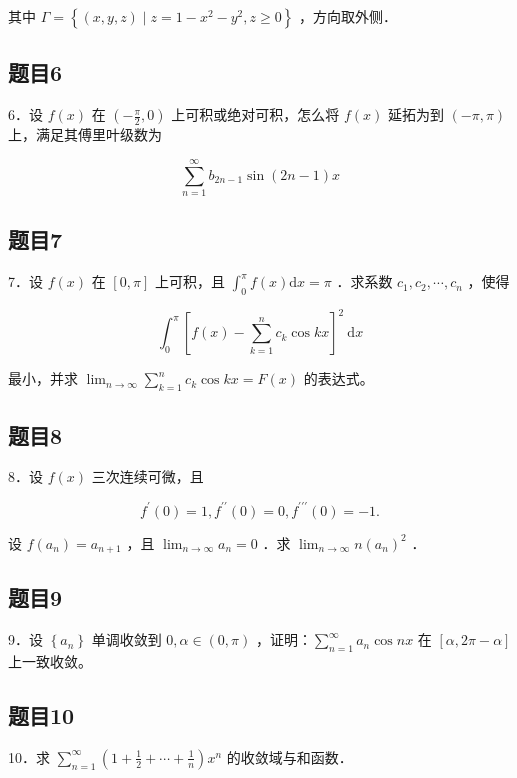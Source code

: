 \documentclass{article}
\begin{document}
其中 \(\Gamma=\left\{(x, y, z) \mid z=1-x^{2}-y^{2}, z \geq 0\right\}\) ，方向取外侧．

\subsection{题目6}
6．设 \(f(x)\) 在 \(\left(-\frac{\pi}{2}, 0\right)\) 上可积或绝对可积，怎么将 \(f(x)\) 延拓为到 \((-\pi, \pi)\) 上，满足其傅里叶级数为

\[
\sum_{n=1}^{\infty} b_{2 n-1} \sin (2 n-1) x
\]

\subsection{题目7}
7．设 \(f(x)\) 在 \([0, \pi]\) 上可积，且 \(\int_{0}^{\pi} f(x) \mathrm{d} x=\pi\) ．求系数 \(c_{1}, c_{2}, \cdots, c_{n}\) ，使得

\[
\int_{0}^{\pi}\left[f(x)-\sum_{k=1}^{n} c_{k} \cos k x\right]^{2} \mathrm{~d} x
\]

最小，并求 \(\lim _{n \rightarrow \infty} \sum_{k=1}^{n} c_{k} \cos k x=F(x)\) 的表达式。

\subsection{题目8}
8．设 \(f(x)\) 三次连续可微，且

\[
f^{\prime}(0)=1, f^{\prime \prime}(0)=0, f^{\prime \prime \prime}(0)=-1 .
\]

设 \(f\left(a_{n}\right)=a_{n+1}\) ，且 \(\lim _{n \rightarrow \infty} a_{n}=0\) ．求 \(\lim _{n \rightarrow \infty} n\left(a_{n}\right)^{2}\) ．

\subsection{题目9}
9．设 \(\left\{a_{n}\right\}\) 单调收敛到 \(0, \alpha \in(0, \pi)\) ，证明：\(\sum_{n=1}^{\infty} a_{n} \cos n x\) 在 \([\alpha, 2 \pi-\alpha]\) 上一致收敛。

\subsection{题目10}
10．求 \(\sum_{n=1}^{\infty}\left(1+\frac{1}{2}+\cdots+\frac{1}{n}\right) x^{n}\) 的收敛域与和函数．
\end{document}
